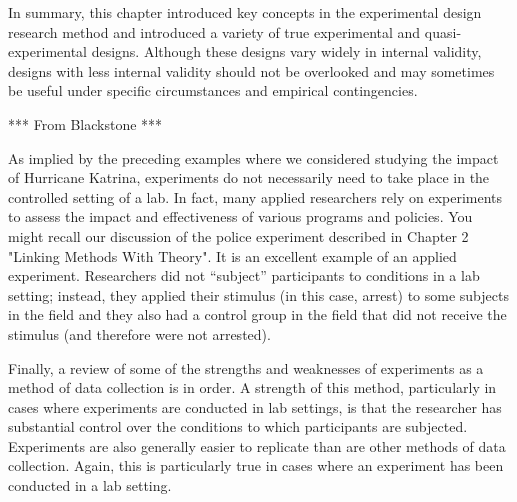 In summary, this chapter introduced key concepts in the experimental design research method and introduced a variety of true experimental and quasi-experimental designs. Although these designs vary widely in internal validity, designs with less internal validity should not be overlooked and may sometimes be useful under specific circumstances and empirical contingencies.

*** From Blackstone ***

As implied by the preceding examples where we considered studying the impact of Hurricane Katrina, experiments do not necessarily need to take place in the controlled setting of a lab. In fact, many applied researchers rely on experiments to assess the impact and effectiveness of various programs and policies. You might recall our discussion of the police experiment described in Chapter 2 "Linking Methods With Theory". It is an excellent example of an applied experiment. Researchers did not “subject” participants to conditions in a lab setting; instead, they applied their stimulus (in this case, arrest) to some subjects in the field and they also had a control group in the field that did not receive the stimulus (and therefore were not arrested).


Finally, a review of some of the strengths and weaknesses of experiments as a method of data collection is in order. A strength of this method, particularly in cases where experiments are conducted in lab settings, is that the researcher has substantial control over the conditions to which participants are subjected. Experiments are also generally easier to replicate than are other methods of data collection. Again, this is particularly true in cases where an experiment has been conducted in a lab setting.


